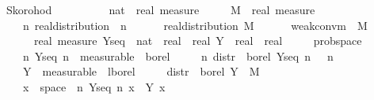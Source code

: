 \documentclass[leqno]{article}
\theoremstyle{definition}
\begin{document}
\begin{isabellebody}
\isamarkupfalse%
\ Skorohod{\isacharcolon}\isanewline
\ \ \ \isanewline
\ \ \ \ {\isasymmu}\ {\isacharcolon}{\isacharcolon}\ {\isachardoublequoteopen}nat\ {\isasymRightarrow}\ real\ measure{\isachardoublequoteclose}\ \isanewline
\ \ \ \ M\ {\isacharcolon}{\isacharcolon}\ {\isachardoublequoteopen}real\ measure{\isachardoublequoteclose}\isanewline
\ \ \ \isanewline
\ \ \ \ {\isachardoublequoteopen}{\isasymAnd}n{\isachardot}\ real{\isacharunderscore}distribution\ {\isacharparenleft}{\isasymmu}\ n{\isacharparenright}{\isachardoublequoteclose}\ \ \isanewline
\ \ \ \ {\isachardoublequoteopen}real{\isacharunderscore}distribution\ M{\isachardoublequoteclose}\ \ \isanewline
\ \ \ \ {\isachardoublequoteopen}weak{\isacharunderscore}conv{\isacharunderscore}m\ {\isasymmu}\ M{\isachardoublequoteclose}\isanewline
\ \ \ {\isachardoublequoteopen}{\isasymexists}\ {\isacharparenleft}{\isasymOmega}\ {\isacharcolon}{\isacharcolon}\ real\ measure{\isacharparenright}\ {\isacharparenleft}Y{\isacharunderscore}seq\ {\isacharcolon}{\isacharcolon}\ nat\ {\isasymRightarrow}\ real\ {\isasymRightarrow}\ real{\isacharparenright}\ {\isacharparenleft}Y\ {\isacharcolon}{\isacharcolon}\ real\ {\isasymRightarrow}\ real{\isacharparenright}{\isachardot}\ \isanewline
\ \ \ \ prob{\isacharunderscore}space\ {\isasymOmega}\ {\isasymand}\isanewline
\ \ \ \ {\isacharparenleft}{\isasymforall}n{\isachardot}\ Y{\isacharunderscore}seq\ n\ {\isasymin}\ measurable\ {\isasymOmega}\ borel{\isacharparenright}\ {\isasymand}\isanewline
\ \ \ \ {\isacharparenleft}{\isasymforall}n{\isachardot}\ distr\ {\isasymOmega}\ borel\ {\isacharparenleft}Y{\isacharunderscore}seq\ n{\isacharparenright}\ {\isacharequal}\ {\isasymmu}\ n{\isacharparenright}\ {\isasymand}\isanewline
\ \ \ \ Y\ {\isasymin}\ measurable\ {\isasymOmega}\ lborel\ {\isasymand}\isanewline
\ \ \ \ distr\ {\isasymOmega}\ borel\ Y\ {\isacharequal}\ M\ {\isasymand}\isanewline
\ \ \ \ {\isacharparenleft}{\isasymforall}x\ {\isasymin}\ space\ {\isasymOmega}{\isachardot}\ {\isacharparenleft}{\isasymlambda}n{\isachardot}\ Y{\isacharunderscore}seq\ n\ x{\isacharparenright}\ {\isacharminus}{\isacharminus}{\isacharminus}{\isacharminus}{\isachargreater}\ Y\ x{\isacharparenright}{\isachardoublequoteclose}
\end{isabellebody}

\medskip
\end{document}
